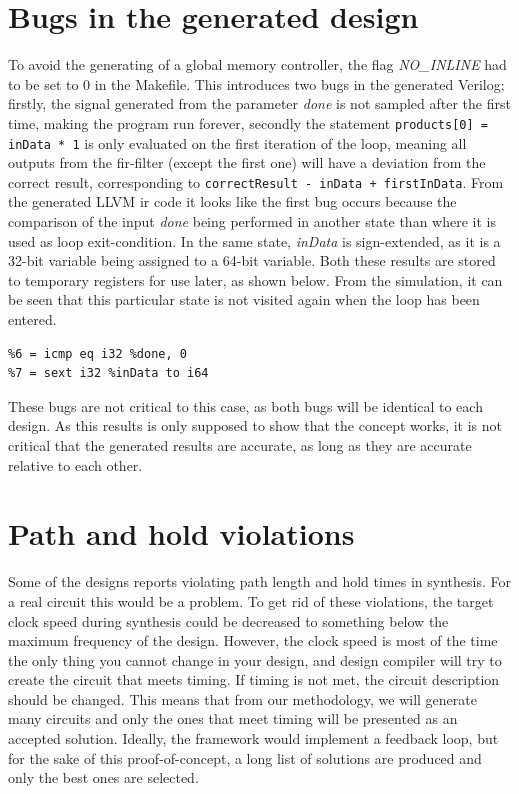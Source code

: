 \section{\label{sec:designbugs}Bugs in the generated design}
To avoid the generating of a global memory controller, the flag \textit{NO\_INLINE} had to be set to 0 in the Makefile. This introduces two bugs in the generated Verilog; firstly, the signal generated from the parameter \textit{done} is not sampled after the first time, making the program run forever, secondly the statement \verb!products[0] = inData * 1! is only evaluated on the first iteration of the loop, meaning all outputs from the \gls{fir}-filter (except the first one) will have a deviation from the correct result, corresponding to \verb!correctResult - inData + firstInData!. From the generated LLVM \gls{ir} code it looks like the first bug occurs because the comparison of the input \textit{done} being performed in another state than where it is used as loop exit-condition. In the same state, \textit{inData} is sign-extended, as it is a 32-bit variable being assigned to a 64-bit variable. Both these results are stored to temporary registers for use later, as shown below. From the simulation, it can be seen that this particular state is not visited again when the loop has been entered.
\lstset{language=llvm,style=LLVMstyle}
\begin{lstlisting}
%6 = icmp eq i32 %done, 0
%7 = sext i32 %inData to i64
\end{lstlisting}
These bugs are not critical to this case, as both bugs will be identical to each design. As this results is only supposed to show that the concept works, it is not critical that the generated results are accurate, as long as they are accurate relative to each other.
\section{Path and hold violations}
Some of the designs reports violating path length and hold times in synthesis. For a real circuit this would be a problem. To get rid of these violations, the target clock speed during synthesis could be decreased to something below the maximum frequency of the design. However, the clock speed is most of the time the only thing you cannot change in your design, and design compiler will try to create the circuit that meets timing. If timing is not met, the circuit description should be changed. This means that from our methodology, we will generate many circuits and only the ones that meet timing will be presented as an accepted solution. Ideally, the framework would implement a feedback loop, but for the sake of this proof-of-concept, a long list of solutions are produced and only the best ones are selected.

